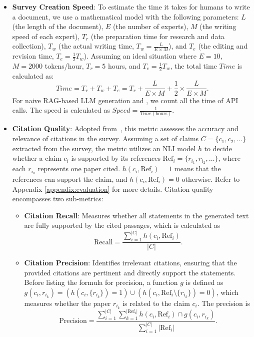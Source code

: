 \begin{itemize}
\item \textbf{Survey Creation Speed}: To estimate the time it takes for humans to write a document, we use a mathematical model with the following parameters: \(L\) (the length of the document), \(E\) (the number of experts), \(M\) (the writing speed of each expert), \(T_r\) (the preparation time for research and data collection), \(T_w\) (the actual writing time, \(T_w = \frac{L}{E \times M}\)), and \(T_e\) (the editing and revision time, \(T_e = \frac{1}{2} T_w\)). Assuming an ideal situation where \(E = 10\), \(M = 2000\) tokens/hour, \(T_r = 5\) hours, and \(T_e = \frac{1}{2} T_w\), the total time \(Time\) is calculated as:
    \begin{equation}
    Time = T_r + T_w + T_e = T_r + \frac{L}{E \times M} + \frac{1}{2} \times \frac{L}{E \times M}.
    \end{equation}
    For naive RAG-based LLM generation and \ourmethod, we count all the time of API calls. The speed is calculated as \(Speed = \frac{1}{Time (\text{hours})}\).

\item
\textbf{Citation Quality}: Adopted from~\cite{gao2023citation}, this metric assesses the accuracy and relevance of citations in the survey. Assuming a set of claims \(C = \{c_1, c_2, \ldots \}\) extracted from the survey, the metric utilizes an NLI model \(h\) to decide whether a claim \(c_i\) is supported by its references \(\text{Ref}_i = \{r_{i_1}, r_{i_2}, \ldots \}\), where each \(r_{i_k}\) represents one paper cited. \(h(c_i, \text{Ref}_i) = 1\) means that the references can support the claim, and \(h(c_i, \text{Ref}_i) = 0\) otherwise. Refer to Appendix \ref{appendix:evaluation} for more details. Citation quality encompasses two sub-metrics:

\begin{itemize}
    \item \textbf{Citation Recall}: Measures whether all statements in the generated text are fully supported by the cited passages, which is calculated as
    \begin{equation}
        \text{Recall} = \frac{\sum_{i=1}^{|C|} h(c_i, \text{Ref}_i)}{|C|}.
    \end{equation}
    
    \item \textbf{Citation Precision}: Identifies irrelevant citations, ensuring that the provided citations are pertinent and directly support the statements. Before listing the formula for precision, a function \(g\) is defined as \(g(c_i, r_{i_k}) = (h(c_i, \{r_{i_k}\}) = 1) \cup (h(c_i, \text{Ref}_i \setminus \{r_{i_k}\}) = 0)\), which measures whether the paper \(r_{i_k}\) is related to the claim \(c_i\). The precision is
    \begin{equation}
        \text{Precision} = \frac{\sum_{i=1}^{|C|} \sum_{k=1}^{|\text{Ref}_i|} h(c_i, \text{Ref}_i) \cap g(c_i, r_{i_k})}{\sum_{i=1}^{|C|} |\text{Ref}_i|}.
    \end{equation}
\end{itemize}


\end{itemize}
